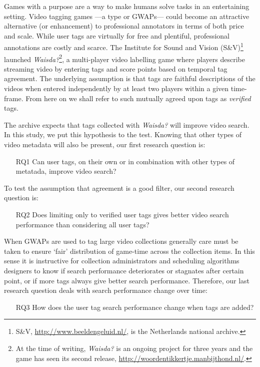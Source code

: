 Games with a purpose are a way to make humans solve tasks in an entertaining setting. Video tagging games ---a type or GWAPs---	
could become an attractive alternative (or enhancement) to professional annotators in terms of both price and scale. While user tags are virtually for free and plentiful, professional annotations are costly and scarce.
The Institute for Sound and Vision (S\&V)\footnote{S\&V, \url{http://www.beeldengeluid.nl/}, is the Netherlands national archive.} launched \textit{Waisda?}\footnote{At the time of writing, \textit{Waisda?} is an ongoing project for three years and the game has seen its second release, \url{http://woordentikkertje.manbijthond.nl/}.}, a multi-player video labelling game where players describe streaming video by entering tags and score points based on temporal tag agreement.  The underlying assumption is that tags are faithful descriptions of the videos when entered independently by at least two players within a given time-frame.  From here on we shall refer to such mutually agreed upon tags as \textit{verified} tags.

The archive expects that tags collected with \textit{Waisda?} will improve video search. In this study, we put this hypothesis to the test.
Knowing that other types of video metadata will also be present, our first research question is:
\begin{itemize}
\item[RQ1] Can user tags, on their own or in combination with other types of metatada, improve video search?
\end{itemize}
To test the assumption that agreement is a good filter,  our second research question is:
\begin{itemize}
\item[RQ2] Does limiting only to verified user tags gives better video search performance than considering all user tags?
\end{itemize}
When GWAPs are used to tag large video collections generally care must be taken to ensure `fair' distribution of game-time across the collection items. In this sense it is instructive for collection administrators and scheduling algorithms designers to know if search performance deteriorates or stagnates after certain point, or if more tags always give better search performance. Therefore, our last research question deals with search performance change over time:
\begin{itemize}
\item[RQ3] How does the user tag search performance change when tags are added?
\end{itemize}

